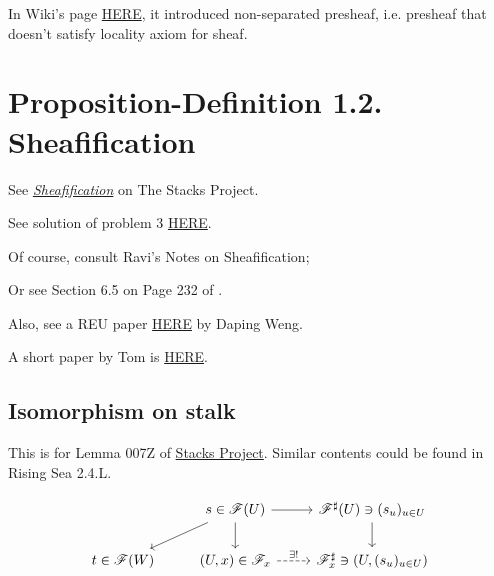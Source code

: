 In Wiki's page \href{https://en.wikipedia.org/wiki/Sheaf_(mathematics)}{HERE}, it introduced non-separated presheaf, i.e. presheaf that doesn't satisfy locality axiom for sheaf.

\section{Proposition-Definition 1.2. Sheafification}

See \href{https://stacks.math.columbia.edu/tag/007X}{\textit{Sheafification}} on The Stacks Project.

See solution of problem 3 \href{https://www2.math.ethz.ch/education/bachelor/lectures/fs2016/math/alg_geom/Solution11.pdf}{HERE}.

Of course, consult Ravi's Notes on Sheafification; 

Or see Section 6.5 on Page 232 of \cite{bosch2013algebraic}.

Also, see a REU paper \href{http://www.math.uchicago.edu/%7Emay/VIGRE/VIGRE2011/REUPapers/WengD.pdf}{HERE} by Daping Weng.

A short paper by Tom is \href{https://www.maths.ed.ac.uk/~tl/sheaves.pdf}{HERE}.

\subsection{Isomorphism on stalk}

This is for Lemma 007Z of \href{https://stacks.math.columbia.edu/tag/007X}{Stacks Project}. Similar contents could be found in Rising Sea 2.4.L.

\[\begin{tikzcd}
	& {s\in\mathscr F(U)} & {\mathscr F^{\sharp}(U)\ni (s_u)_{u\in U}} \\
	{t\in\mathscr F(W)} & {(U,x)\in \mathscr F_x} & {\mathscr F_x^{\sharp}\ni (U,(s_u)_{u\in U})}
	\arrow[from=1-2, to=1-3]
	\arrow[from=1-2, to=2-2]
	\arrow[from=1-3, to=2-3]
	\arrow["{\exists !}", dashed, from=2-2, to=2-3]
	\arrow[from=1-2, to=2-1]
\end{tikzcd}\]

